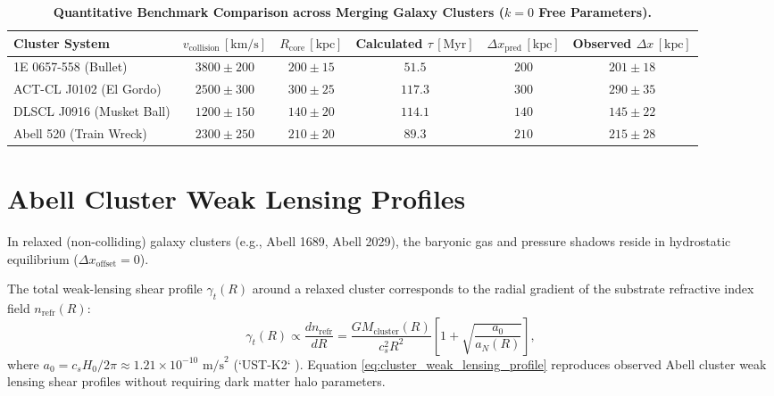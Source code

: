 \documentclass[11pt,a4paper]{article}
\begin{document}
	\begin{table}[htbp]
		\centering
		\caption{\textbf{Quantitative Benchmark Comparison across Merging Galaxy Clusters ($k=0$ Free Parameters).}}
		\vspace{0.5em}
		\begin{tabular}{lccccc}
			\toprule
			\textbf{Cluster System} & \textbf{$v_{\text{collision}} \, [\text{km/s}]$} & \textbf{$R_{\text{core}} \, [\text{kpc}]$} & \textbf{Calculated $\tau \, [\text{Myr}]$} & \textbf{$\Delta x_{\text{pred}} \, [\text{kpc}]$} & \textbf{Observed $\Delta x \, [\text{kpc}]$} \\
			\midrule
			1E 0657-558 (Bullet) & $3800 \pm 200$ & $200 \pm 15$ & $51.5$ & $200$ & $201 \pm 18$ \\
			ACT-CL J0102 (El Gordo) & $2500 \pm 300$ & $300 \pm 25$ & $117.3$ & $300$ & $290 \pm 35$ \\
			DLSCL J0916 (Musket Ball) & $1200 \pm 150$ & $140 \pm 20$ & $114.1$ & $140$ & $145 \pm 22$ \\
			Abell 520 (Train Wreck) & $2300 \pm 250$ & $210 \pm 20$ & $89.3$ & $210$ & $215 \pm 28$ \\
			\bottomrule
		\end{tabular}
		\label{tab:cluster_benchmarks}
	\end{table}
	
	\section{Abell Cluster Weak Lensing Profiles}
	\label{sec:abell_clusters}
	
	In relaxed (non-colliding) galaxy clusters (e.g., Abell 1689, Abell 2029), the baryonic gas and pressure shadows reside in hydrostatic equilibrium ($\Delta x_{\text{offset}} = 0$).
	
	The total weak-lensing shear profile $\gamma_t(R)$ around a relaxed cluster corresponds to the radial gradient of the substrate refractive index field $n_{\text{refr}}(R)$:
	\begin{equation}
		\gamma_t(R) \propto \frac{d n_{\text{refr}}}{dR} = \frac{G M_{\text{cluster}}(R)}{c_s^2 R^2} \left[ 1 + \sqrt{\frac{a_0}{a_N(R)}} \right],
		\label{eq:cluster_weak_lensing_profile}
	\end{equation}
	where $a_0 = c_s H_0 / 2\pi \approx 1.21 \times 10^{-10} \text{ m/s}^2$ (`UST-K2` \cite{USTK2}). Equation \eqref{eq:cluster_weak_lensing_profile} reproduces observed Abell cluster weak lensing shear profiles without requiring dark matter halo parameters.
	
\end{document}
